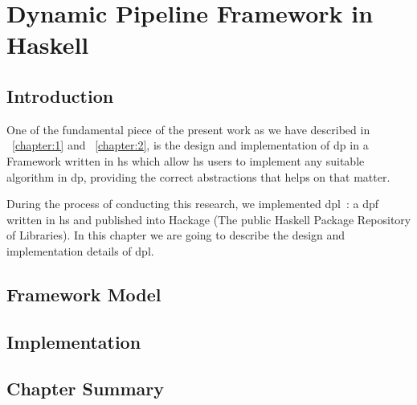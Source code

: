 \chapter{Dynamic Pipeline Framework in Haskell}
\section{Introduction}
One of the fundamental piece of the present work as we have described in ~\autoref{chapter:1} and ~\autoref{chapter:2},
is the design and implementation of \acrshort{dp} in a Framework written in \acrshort{hs} which allow \acrshort{hs} users
to implement any suitable algorithm in \acrshort{dp}, providing the correct abstractions that helps on that matter.

During the process of conducting this research, we implemented \acrfull{dpl}~\cite{dynamic-pipeline}: 
a \acrfull{dpf} written in \acrshort{hs} and published into Hackage (The public Haskell Package Repository of Libraries).
In this chapter we are going to describe the design and implementation details of \acrshort{dpl}.

\section{Framework Model}
\section{Implementation}
\section{Chapter Summary}

